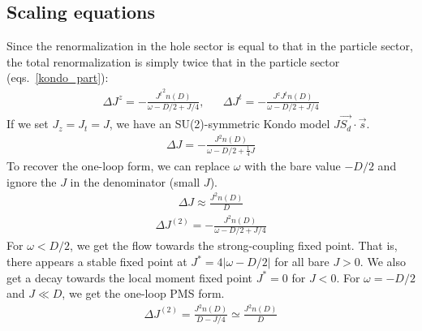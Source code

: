 \documentclass{revtex4-2}
\numberwithin{equation}{section}
\begin{document}
\subsection{Scaling equations}
Since the renormalization in the hole sector is equal to that in the particle sector, the total renormalization is simply twice that in the particle sector (eqs.~\ref{kondo_part}):
\begin{equation}\begin{aligned}
	\Delta J^z = -\frac{{J^t}^2n(D)}{\omega - D/2 + J/4}, && \Delta J^t = -\frac{J^z J^tn(D)}{\omega - D/2 + J/4}
\end{aligned}\end{equation}
If we set \(J_z = J_t = J\), we have an SU(2)-symmetric Kondo model \(J \vec{S_d}\cdot\vec{s}\).
\begin{equation}\begin{aligned}
	\label{kondosym}
	\Delta J = - \frac{J^2 n(D)}{\omega - D/2 + \frac{1}{4}J}
\end{aligned}\end{equation}
To recover the one-loop form, we can replace \(\omega\) with the bare value \(-D/2\) and ignore the \(J\) in the denominator (small \(J\)).
\begin{equation}\begin{aligned}
	\Delta J \approx \frac{J^2 n(D)}{D}
\end{aligned}\end{equation}
\begin{equation}\begin{aligned}
	\Delta J^{(2)} = -\frac{J^2 n(D)}{\omega - D/2 + J/4}
\end{aligned}\end{equation}
For \(\omega < D/2\), we get the flow towards the strong-coupling fixed point. That is, there appears a stable fixed point at \(J^* = 4|\omega - D/2|\) for all bare \(J > 0\). We also get a decay towards the local moment fixed point \(J^* = 0\) for \(J < 0\). For \(\omega = -D/2\) and \(J \ll D\), we get the one-loop PMS form. 
\begin{equation}\begin{aligned}
	\Delta J^{(2)} = \frac{J^2 n(D)}{D - J/4} \simeq \frac{J^2 n(D)}{D}
\end{aligned}\end{equation}
\end{document}
